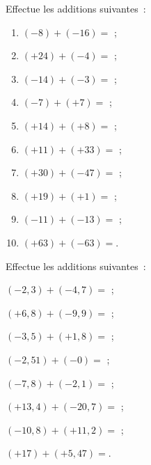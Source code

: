 \begin{exercice}
Effectue les additions suivantes :
\begin{enumerate}
 \item $(-8) + (-16)=$ \dotfill;
   \vspace{.3em}
 \item $(+24) + (-4)=$ \dotfill;
    \vspace{.3em}
 \item $(-14) + (-3)=$ \dotfill;
    \vspace{.3em}
 \item $(-7) + (+7)=$ \dotfill;
    \vspace{.3em}
 \item $(+14) + (+8)=$ \dotfill;
    \vspace{.3em}
 \item $(+11) + (+33)=$ \dotfill;
    \vspace{.3em}
 \item $(+30) + (-47)=$ \dotfill;
    \vspace{.3em}
 \item $(+19) + (+1)=$ \dotfill;
    \vspace{.3em}
 \item $(-11) + (-13)=$ \dotfill;
    \vspace{.3em}
 \item $(+63) + (-63)=$\dotfill.
 \end{enumerate}
\end{exercice}


\begin{exercice}
Effectue les additions suivantes :
\begin{colenumerate}{1}
 \item $(-2,3) + (-4,7)=$ \dotfill ;
    \vspace{.3em}
 \item $(+6,8) + (-9,9)=$ \dotfill;
    \vspace{.3em}
 \item $(-3,5) + (+1,8)=$ \dotfill;
    \vspace{.3em}
 \item $(-2,51) + (-0)=$ \dotfill;
    \vspace{.3em}
 \item $(-7,8) + (-2,1)=$ \dotfill;
    \vspace{.3em}
 \item $(+13,4) + (-20,7)=$ \dotfill;
    \vspace{.3em}
 \item $(-10,8) + (+11,2)=$ \dotfill;
    \vspace{.3em}
 \item $(+17) + (+5,47)=$\dotfill.
 \end{colenumerate}
\end{exercice}


